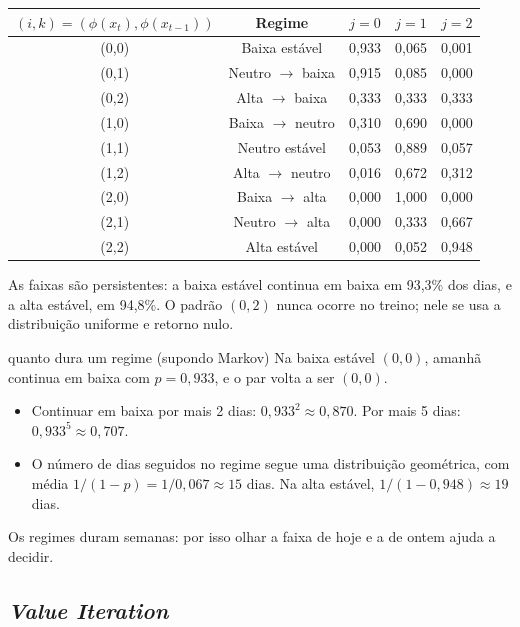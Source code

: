 \documentclass[11pt,a4paper]{article}
\newcommand{\bloco}[1]{\par\needspace{4\baselineskip}{\bfseries #1}\par\nopagebreak}
\begin{document}
\begin{center}
\small
\begin{tabular}{c c ccc}
  \toprule
  $(i,k) = (\phi(x_t), \phi(x_{t-1}))$ & Regime & $j = 0$ & $j = 1$ & $j = 2$ \\
  \midrule
  (0,0) & Baixa estável        & 0,933 & 0,065 & 0,001 \\
  (0,1) & Neutro $\to$ baixa   & 0,915 & 0,085 & 0,000 \\
  (0,2) & Alta $\to$ baixa     & 0,333 & 0,333 & 0,333 \\
  \midrule
  (1,0) & Baixa $\to$ neutro   & 0,310 & 0,690 & 0,000 \\
  (1,1) & Neutro estável       & 0,053 & 0,889 & 0,057 \\
  (1,2) & Alta $\to$ neutro    & 0,016 & 0,672 & 0,312 \\
  \midrule
  (2,0) & Baixa $\to$ alta     & 0,000 & 1,000 & 0,000 \\
  (2,1) & Neutro $\to$ alta    & 0,000 & 0,333 & 0,667 \\
  (2,2) & Alta estável         & 0,000 & 0,052 & 0,948 \\
  \bottomrule
\end{tabular}
\end{center}

\bloco{Leitura}
As faixas são persistentes: a baixa estável continua em baixa em 93,3\% dos dias, e a alta estável, em 94,8\%. O padrão $(0,2)$ nunca ocorre no treino; nele se usa a distribuição uniforme e retorno nulo.

\begin{exemplo}{quanto dura um regime (supondo Markov)}
Na baixa estável $(0,0)$, amanhã continua em baixa com $p = 0{,}933$, e o par volta a ser $(0,0)$.
\begin{itemize}
  \item Continuar em baixa por mais 2 dias: $0{,}933^2 \approx 0{,}870$. Por mais 5 dias: $0{,}933^5 \approx 0{,}707$.
  \item O número de dias seguidos no regime segue uma distribuição geométrica, com média $1/(1 - p) = 1/0{,}067 \approx 15$ dias. Na alta estável, $1/(1 - 0{,}948) \approx 19$ dias.
\end{itemize}
Os regimes duram semanas: por isso olhar a faixa de hoje e a de ontem ajuda a decidir.
\end{exemplo}

\subsection{\textit{Value Iteration}}
\end{document}
